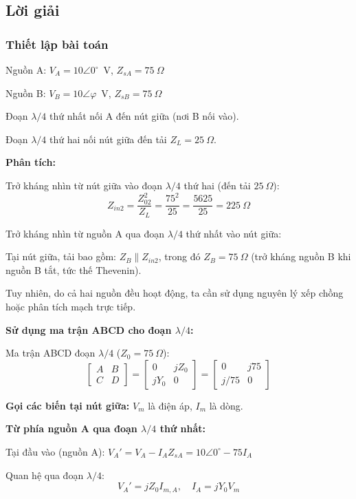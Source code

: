 \documentclass[12pt,a4paper]{article}
\begin{document}
\subsection{Lời giải}

\subsubsection{Thiết lập bài toán}

Nguồn A: $V_A = 10\angle 0^\circ$~V, $Z_{sA} = 75~\Omega$

Nguồn B: $V_B = 10\angle\varphi$~V, $Z_{sB} = 75~\Omega$

Đoạn $\lambda/4$ thứ nhất nối A đến nút giữa (nơi B nối vào).

Đoạn $\lambda/4$ thứ hai nối nút giữa đến tải $Z_L = 25~\Omega$.

\textbf{Phân tích:}

Trở kháng nhìn từ nút giữa vào đoạn $\lambda/4$ thứ hai (đến tải $25~\Omega$):
\[
Z_{in2} = \frac{Z_{02}^2}{Z_L} = \frac{75^2}{25} = \frac{5625}{25} = 225~\Omega
\]

Trở kháng nhìn từ nguồn A qua đoạn $\lambda/4$ thứ nhất vào nút giữa:

Tại nút giữa, tải bao gồm: $Z_B \| Z_{in2}$, trong đó $Z_B = 75~\Omega$ (trở kháng nguồn B khi nguồn B tắt, tức thế Thevenin).

Tuy nhiên, do cả hai nguồn đều hoạt động, ta cần sử dụng nguyên lý xếp chồng hoặc phân tích mạch trực tiếp.

\textbf{Sử dụng ma trận ABCD cho đoạn $\lambda/4$:}

Ma trận ABCD đoạn $\lambda/4$ ($Z_0 = 75~\Omega$):
\[
\begin{bmatrix} A & B \\ C & D \end{bmatrix} = \begin{bmatrix} 0 & jZ_0 \\ jY_0 & 0 \end{bmatrix} = \begin{bmatrix} 0 & j75 \\ j/75 & 0 \end{bmatrix}
\]

\textbf{Gọi các biến tại nút giữa:} $V_m$ là điện áp, $I_m$ là dòng.

\textbf{Từ phía nguồn A qua đoạn $\lambda/4$ thứ nhất:}

Tại đầu vào (nguồn A): $V_A' = V_A - I_A Z_{sA} = 10\angle 0^\circ - 75 I_A$

Quan hệ qua đoạn $\lambda/4$:
\[
V_A' = jZ_0 I_{m,A}, \quad I_A = jY_0 V_m
\]
\end{document}
